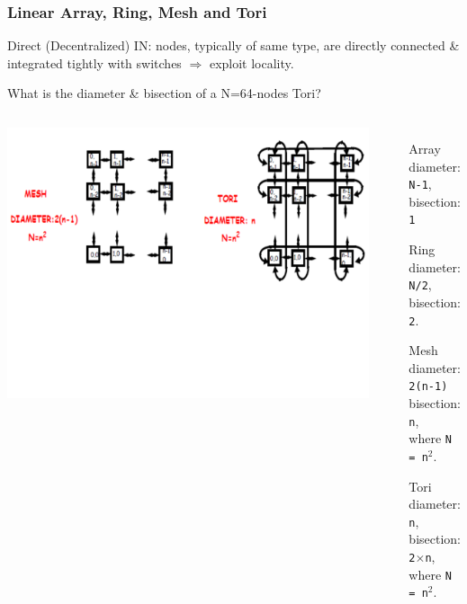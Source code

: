 \documentclass{beamer}
\renewcommand{\emph}[1]{\textcolor{structure}{#1}}
\newcommand{\emp}[1]{\textcolor{DikuRed}{ #1}}
\begin{document}
\begin{frame}[fragile,t]
\frametitle{Linear Array, Ring, Mesh and Tori}

\emp{Direct (Decentralized) IN}: nodes, typically of same type, are directly 
connected \& integrated tightly with switches $\Rightarrow$ \emph{exploit locality}.

\medskip
\alert{What is the diameter \& bisection of a N=64-nodes Tori?}

\begin{columns}
\vspace{-2ex}
\vspace{-11ex}

\includegraphics[width=44ex]{Figures/FigsInterconnect/MeshTori}\pause
{}
\vspace{-10ex}
\begin{itemize}
    \item[Array] diameter: {\tt N-1},\\ bisection: {\tt 1}\medskip
    \item[Ring]  diameter: {\tt N/2},\\ bisection: {\tt 2}.\bigskip
    \item[Mesh]  diameter: {\tt 2(n-1)}\\ bisection: {\tt n},\\ where {\tt N = n$^2$}.\medskip 
    \item[Tori]  diameter: {\tt n},\\ bisection: {\tt 2$\times$n},\\ where {\tt N = n$^2$}.\medskip
\end  {itemize}
\end{columns}

\end{frame}
\end{document}
